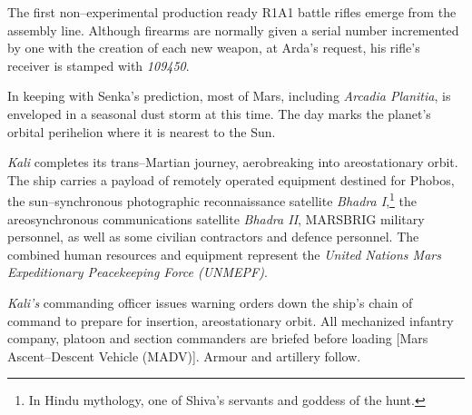The first non--experimental production ready R1A1 battle rifles emerge from the assembly line. Although firearms are normally given a serial number incremented by one with the creation of each new weapon, at Arda's request, his rifle's receiver is stamped with {\it 109450}.
\StopTimelineDate

In keeping with Senka's prediction, most of Mars, including {\it Arcadia Planitia}, is enveloped in a seasonal dust storm at this time. The day marks the planet's orbital perihelion where it is nearest to the Sun.
\StopTimelineDate

{\it Kali} completes its trans--Martian journey, aerobreaking into areostationary orbit. The ship carries a payload of remotely operated equipment destined for Phobos, the sun--synchronous photographic reconnaissance satellite {\it Bhadra I},\footnote{In Hindu mythology, one of Shiva's servants and goddess of the hunt.} the areosynchronous communications satellite {\it Bhadra II}, MARSBRIG military personnel, as well as some civilian contractors and defence personnel. The combined human resources and equipment represent the {\it United Nations Mars Expeditionary Peacekeeping Force (UNMEPF)}.
\StopTimelineDate

{\it Kali's} commanding officer issues warning orders down the ship's chain of command to prepare for insertion, areostationary orbit. All mechanized infantry company, platoon and section commanders are briefed before loading [Mars Ascent--Descent Vehicle (MADV)]. Armour and artillery follow.
\StopTimelineDate

